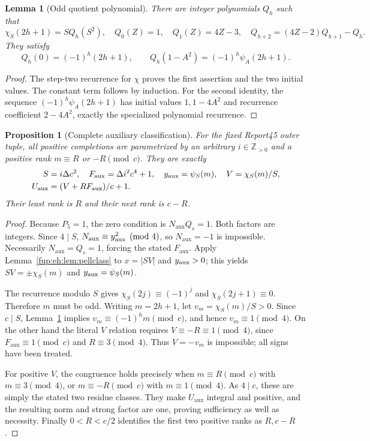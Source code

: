 \documentclass[11pt,letterpaper]{article}
\newtheorem{lemma}[theorem]{Lemma}
\newtheorem{proposition}[theorem]{Proposition}
\theoremstyle{definition}\newtheorem{definition}[theorem]{Definition}
\theoremstyle{remark}\newtheorem{remark}[theorem]{Remark}
\newcommand{\pos}{\mathbb Z_{>0}}
\newcommand{\D}{\Delta}
\newcommand{\ch}[2]{\chi_{#1}(#2)}\newcommand{\ps}[2]{\psi_{#1}(#2)}
\newcommand{\Na}{N_{\mathrm{aux}}}\newcommand{\Nk}{N_{\mathrm{index}}}\newcommand{\Nt}{N_{\mathrm{transport}}}
\newcommand{\Fa}{F_{\mathrm{aux}}}\newcommand{\Ua}{U_{\mathrm{aux}}}\newcommand{\ttt}{t_{\mathrm{tr}}}
\begin{document}
\begin{lemma}[Odd quotient polynomial]\label{fup:eh:lem:oddpoly}
There are integer polynomials $Q_h$ such that
\[
 \chi_S(2h+1)=S Q_h(S^2),\quad
 Q_0(Z)=1,\quad Q_1(Z)=4Z-3,\quad
 Q_{h+2}=(4Z-2)Q_{h+1}-Q_h.
\]
They satisfy
\begin{equation}\label{fup:eh:eq:Qidentities}
 Q_h(0)=(-1)^h(2h+1),\qquad
 Q_h(1-A^2)=(-1)^h\psi_A(2h+1).
\end{equation}
\end{lemma}
\begin{proof}
The step-two recurrence for $\chi$ proves the first assertion and
the two initial values. The constant term follows by induction.
For the second identity, the sequence $(-1)^h\psi_A(2h+1)$ has
initial values $1,1-4A^2$ and recurrence coefficient $2-4A^2$,
exactly the specialized polynomial recurrence.
\end{proof}

\begin{proposition}[Complete auxiliary classification]\label{fup:eh:prop:allaux}
For the fixed Report45 outer tuple, all positive completions are
parametrized by an arbitrary $i\in\pos$ and a positive rank
$m\equiv R$ or $-R\pmod c$. They are exactly
\begin{align*}
 S&=i\D c^2,\quad \Fa=\D i^2c^4+1,\quad
 \yaux=\ps S m,\quad V=\ch S m/S,\\
 \Ua&=(V+R\Fa)/c+1.
\end{align*}
Their least rank is $R$ and their next rank is $c-R$.
\end{proposition}
\begin{proof}
Because $P_5=1$, the zero condition is $\Na Q_s=1$.
Both factors are integers. Since $4\mid S$,
$\Na\equiv\yaux^2\pmod4$, so $\Na=-1$ is impossible.
Necessarily $\Na=Q_s=1$, forcing the stated $\Fa$.
Apply Lemma~\ref{fup:eh:lem:pellclass} to $x=|SV|$ and $y_{\mathrm{aux}}>0$;
this yields $SV=\pm\chi_S(m)$ and $y_{\mathrm{aux}}=\psi_S(m)$.

The recurrence modulo $S$ gives
$\chi_S(2j)\equiv(-1)^j$ and $\chi_S(2j+1)\equiv0$.
Therefore $m$ must be odd. Writing $m=2h+1$, let
$v_m=\chi_S(m)/S>0$. Since $c\mid S$, Lemma~\ref{fup:eh:lem:oddpoly}
implies $v_m\equiv(-1)^h m\pmod c$, and hence
$v_m\equiv1\pmod4$. On the other hand the literal $V$ relation
requires $V\equiv-R\equiv1\pmod4$, since
$\Fa\equiv1\pmod c$ and $R\equiv3\pmod4$.
Thus $V=-v_m$ is impossible; all signs have been treated.

For positive $V$, the congruence holds precisely when
$m\equiv R\pmod c$ with $m\equiv3\pmod4$, or
$m\equiv-R\pmod c$ with $m\equiv1\pmod4$.
As $4\mid c$, these are simply the stated two residue classes.
They make $\Ua$ integral and positive, and the resulting norm and
strong factor are one, proving sufficiency as well as necessity.
Finally $0<R<c/2$ identifies the first two positive ranks as
$R,c-R$.
\end{proof}
\end{document}
